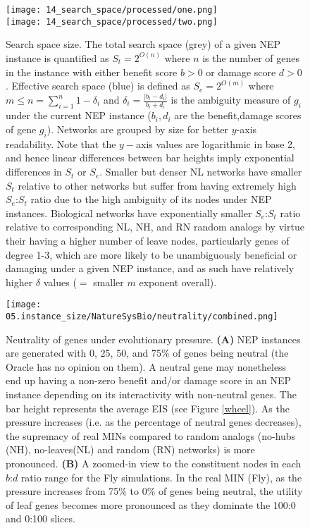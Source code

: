 \begin{figure}[H]%
    \texttt{[image: 14\_search\_space/processed/one.png]}\\
    \texttt{[image: 14\_search\_space/processed/two.png]}
    \caption{
                  Search space size.
                  The total search space (grey) of a given NEP instance is quantified as $S_t = 2^{O(n)}$ where $n$ is the number of genes in the instance with either benefit score $b>0$ or damage score $d>0$.
                  Effective search space (blue) is  defined as $S_e=2^{O(m)}$ where $m\leq n=\sum\limits_{i=1}^{n}{1-\delta_i}$ and  ${\delta}_i=\frac{|b_i-d_i|}{b_i+d_i}$ is the ambiguity measure of $g_i$ under the current NEP instance ($b_i,d_i$ are the benefit,damage scores of gene $g_i$). Networks are grouped by size for better $y$-axis readability. Note that the $y-$axis values are logarithmic in base 2, and hence linear differences between bar heights imply exponential differences in $S_t$ or $S_e$. Smaller  but denser NL networks have smaller $S_t$ relative to other networks but suffer from having extremely high $S_e$:$S_t$ ratio due to the high ambiguity of its nodes under NEP instances. Biological networks have exponentially smaller $S_e$:$S_t$ ratio relative to corresponding NL, NH, and RN random analogs  by virtue their having a higher number of leave nodes, particularly genes of degree 1-3, which are more likely to be unambiguously beneficial or damaging under a given NEP instance, and as such have relatively higher $\delta$ values ($=$ smaller $m$ exponent overall).
             }\label{fig:search_space}
\end{figure}

\begin{figure}[H]%
        \centering
                \texttt{[image: 05.instance\_size/NatureSysBio/neutrality/combined.png]}
                \singlespacing\caption
                {
                    Neutrality of genes under evolutionary pressure. \textbf{(A)} NEP instances are generated with 0, 25, 50, and 75\% of genes being neutral (the Oracle has no opinion on them). A neutral gene may nonetheless end up having a non-zero benefit and/or damage score in an NEP instance depending on its interactivity with non-neutral genes. The bar height represents the average EIS (see Figure \ref{wheel}). As the pressure increases (i.e. as the percentage of neutral genes decreases), the supremacy of real MINs compared to random analogs (no-hubs (NH), no-leaves(NL) and random (RN) networks) is more pronounced. \textbf{(B)} A zoomed-in view to the constituent nodes in each $b$:$d$ ratio range for the Fly simulations. In the real MIN (Fly), as the pressure increases from 75\% to 0\% of genes being neutral, the utility of leaf genes becomes more pronounced as they dominate the 100:0 and 0:100 slices.
                }
                \label{fig:neutrality}
\end{figure}

